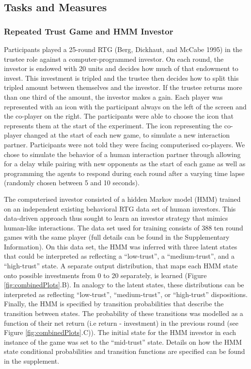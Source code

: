 \documentclass[
]{article}
\begin{document}
\subsection{Tasks and Measures}\label{tasks-and-measures}

\subsubsection{Repeated Trust Game and HMM Investor}\label{repeated-trust-game-and-hmm-investor}

Participants played a 25-round RTG (Berg, Dickhaut, and McCabe 1995) in the trustee
role against a computer-programmed investor. On each round, the investor
is endowed with 20 units and decides how much of that endowment to
invest. This investment is tripled and the trustee then decides how to
split this tripled amount between themselves and the investor. If the trustee
returns more than one third of the amount, the investor makes a gain.
Each player was represented with an icon with the participant always on
the left of the screen and the co-player on the right. The participants
were able to choose the icon that represents them at the start of the
experiment. The icon representing the co-player changed at the start of
each new game, to simulate a new interaction partner. Participants were
not told they were facing computerised co-players. We chose to simulate
the behavior of a human interaction partner through allowing for a delay
while pairing with new opponents as the start of each game as well as
programming the agents to respond during each round after a varying time
lapse (randomly chosen between 5 and 10 seconds).

The computerised investor consisted of a hidden Markov model (HMM)
trained on an independent existing behavioral RTG data set of human
investors. This data-driven approach thus sought to learn an investor
strategy that mimics human-like interactions. The data set used for
training consists of 388 ten round games with the same player (full
details can be found in the Supplementary Information). On this data
set, the HMM was inferred with three latent states that could be
interpreted as reflecting a ``low-trust'', a ``medium-trust'', and a
``high-trust'' state. A separate output distribution, that maps each HMM
state onto possible investments from 0 to 20 separately, is learned
(Figure \ref{fig:combinedPlots}.B). In analogy to the latent states, these
distributions can be interpreted as reflecting ``low-trust'',
``medium-trust'', or ``high-trust'' dispositions. Finally, the HMM is
specified by transition probabilities that describe the transition
between states. The probability of these transitions was modelled as a
function of their net return (i.e return - investment) in the previous
round (see Figure \ref{fig:combinedPlots}.C)). The initial state for the
HMM investor in each instance of the game was set to the ``mid-trust''
state. Details on how the HMM state conditional probabilities and
transition functions are specified can be found in the supplement.
\end{document}
